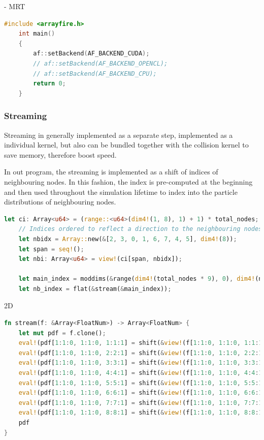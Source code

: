 - MRT \\

\begin{lstlisting}[language=Cpp, caption=C++ code for setting different computing backends., label=cpp-backends]
	#include <arrayfire.h>
	int main()
	{
		af::setBackend(AF_BACKEND_CUDA);
		// af::setBackend(AF_BACKEND_OPENCL);
		// af::setBackend(AF_BACKEND_CPU);
		return 0;
	}
\end{lstlisting}

\subsubsection{Streaming}

Streaming in generally implemented as a separate step, implemented as a individual kernel, but also can be bundled together with the collision kernel to save memory, therefore boost speed.

In out program, the streaming is implemented as a shift of indices of neighbouring nodes. In this fashion, the index is pre-computed at the beginning and then used throughout the simulation lifetime to index into the particle distributions of neighbouring nodes.

\begin{lstlisting}[language=Rust, caption=Pre-computed streaming step in the way of shifting indices during the program intialization phase., label=rust-nb-index]
	let ci: Array<u64> = (range::<u64>(dim4!(1, 8), 1) + 1) * total_nodes;
	// Indices ordered to reflect a direction to the neighbouring nodes
	let nbidx = Array::new(&[2, 3, 0, 1, 6, 7, 4, 5], dim4!(8));
	let span = seq!();
	let nbi: Array<u64> = view!(ci[span, nbidx]);
	
	let main_index = moddims(&range(dim4!(total_nodes * 9), 0), dim4!(nx, ny, 9));
	let nb_index = flat(&stream(&main_index));
\end{lstlisting}

2D \\

\begin{lstlisting}[language=Rust, caption=Streaming with \texttt{shift} function for two dimensions with 9 discrete speeds (D2Q9)., label=rust-streaming-2d]
fn stream(f: &Array<FloatNum>) -> Array<FloatNum> {
	let mut pdf = f.clone();
	eval!(pdf[1:1:0, 1:1:0, 1:1:1] = shift(&view!(f[1:1:0, 1:1:0, 1:1:1]), &[1, 0, 0, 0]));
	eval!(pdf[1:1:0, 1:1:0, 2:2:1] = shift(&view!(f[1:1:0, 1:1:0, 2:2:1]), &[0, 1, 0, 0]));
	eval!(pdf[1:1:0, 1:1:0, 3:3:1] = shift(&view!(f[1:1:0, 1:1:0, 3:3:1]), &[-1, 0, 0, 0]));
	eval!(pdf[1:1:0, 1:1:0, 4:4:1] = shift(&view!(f[1:1:0, 1:1:0, 4:4:1]), &[0, -1, 0, 0]));
	eval!(pdf[1:1:0, 1:1:0, 5:5:1] = shift(&view!(f[1:1:0, 1:1:0, 5:5:1]), &[1, 1, 0, 0]));
	eval!(pdf[1:1:0, 1:1:0, 6:6:1] = shift(&view!(f[1:1:0, 1:1:0, 6:6:1]), &[-1, 1, 0, 0]));
	eval!(pdf[1:1:0, 1:1:0, 7:7:1] = shift(&view!(f[1:1:0, 1:1:0, 7:7:1]), &[-1, -1, 0, 0]));
	eval!(pdf[1:1:0, 1:1:0, 8:8:1] = shift(&view!(f[1:1:0, 1:1:0, 8:8:1]), &[1, -1, 0, 0]));
	pdf
}
\end{lstlisting}


